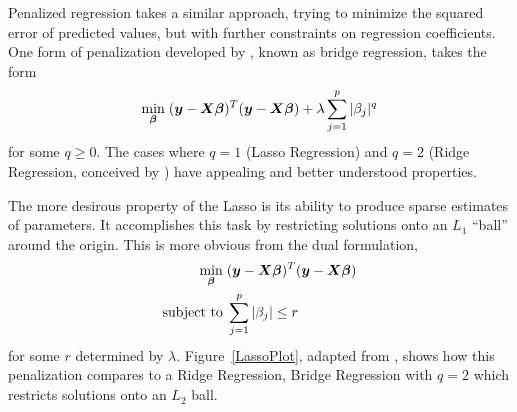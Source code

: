 \documentclass{uwstat572}
\begin{document}
Penalized regression takes a similar approach, trying to minimize the squared error of predicted values, but with further constraints on regression coefficients. One form of penalization developed by \cite{fu1998penalized}, known as bridge regression, takes the form  \[
\min_{\boldsymbol{\beta}}  \hspace{.1cm} (\boldsymbol{y}-\boldsymbol{X}\boldsymbol{\beta})^T(\boldsymbol{y}-\boldsymbol{X}\boldsymbol{\beta})+\lambda\sum_{j=1}^p|\beta_j|^q
\] for some $q\geq0$. The cases where $q=1$ (Lasso Regression) and $q=2$ (Ridge Regression, conceived by \cite{hoerl1970ridge}) have appealing and better understood properties.

The more desirous property of the Lasso is its ability to produce sparse estimates of parameters. It accomplishes this task by restricting solutions onto an $L_1$ ``ball'' around the origin. This is more obvious from the dual formulation, 
\begin{align*}
\min_{\boldsymbol{\beta}}  \hspace{.1cm} &(\boldsymbol{y}-\boldsymbol{X}\boldsymbol{\beta})^T(\boldsymbol{y}-\boldsymbol{X}\boldsymbol{\beta})\\
\text{subject to} \hspace{.1cm}&\sum_{j=1}^p|\beta_j|\leq r
\end{align*}
for some $r$ determined by $\lambda$. Figure~\ref{LassoPlot}, adapted from \cite{park2008bayesian}, shows how this penalization compares to a Ridge Regression, Bridge Regression with $q=2$ which restricts solutions onto an $L_2$ ball.
\end{document}
